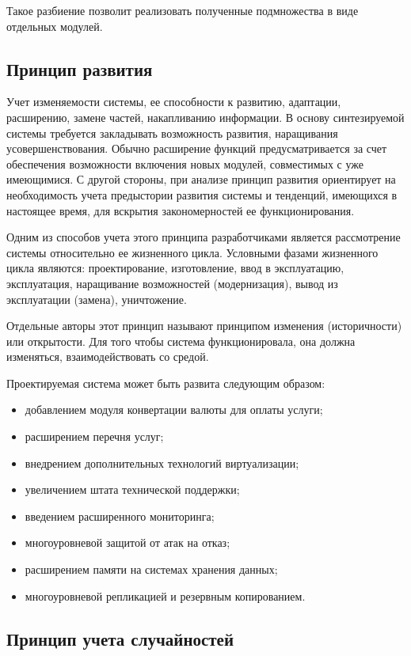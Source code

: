 Такое разбиение позволит реализовать полученные подмножества в виде отдельных модулей.

\subsection{Принцип развития}

Учет изменяемости системы, ее способности к развитию, адаптации, расширению, замене частей, накапливанию информации.
В основу синтезируемой системы требуется закладывать возможность развития, наращивания усовершенствования.
Обычно расширение функций предусматривается за счет обеспечения возможности включения новых модулей, совместимых с уже имеющимися.
С другой стороны, при анализе принцип развития ориентирует на необходимость учета предыстории развития системы и тенденций, имеющихся в настоящее время, для вскрытия закономерностей ее функционирования.

Одним из способов учета этого принципа разработчиками является рассмотрение системы относительно ее жизненного цикла.
Условными фазами жизненного цикла являются: проектирование, изготовление, ввод в эксплуатацию, эксплуатация, наращивание возможностей (модернизация), вывод из эксплуатации (замена), уничтожение.

Отдельные авторы этот принцип называют принципом изменения (историчности) или открытости.
Для того чтобы система функционировала, она должна изменяться, взаимодействовать со средой.

Проектируемая система может быть развита следующим образом:
\begin{itemize}
  \item добавлением модуля конвертации валюты для оплаты услуги;
  \item расширением перечня услуг;
  \item внедрением дополнительных технологий виртуализации;
  \item увеличением штата технической поддержки;
  \item введением расширенного мониторинга;
  \item многоуровневой защитой от атак на отказ;
  \item расширением памяти на системах хранения данных;
  \item многоуровневой репликацией и резервным копированием.
\end{itemize}

\subsection{Принцип учета случайностей}

